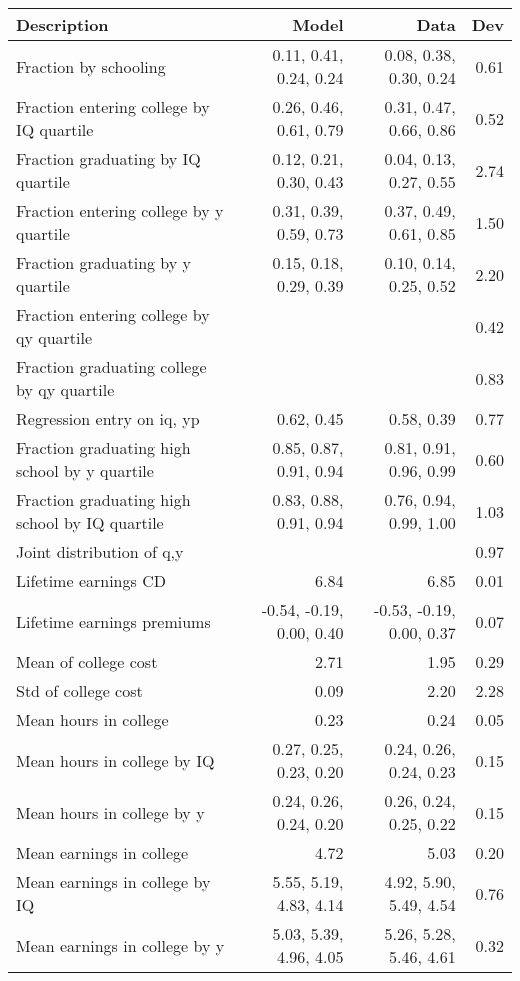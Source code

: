 \begin{tabular}{lrrr}
\hline
Description & Model  & Data  & Dev  \\ 
\hline
Fraction by schooling & 0.11, 0.41, 0.24, 0.24  & 0.08, 0.38, 0.30, 0.24  & 0.61  \\ 
Fraction entering college by IQ quartile & 0.26, 0.46, 0.61, 0.79  & 0.31, 0.47, 0.66, 0.86  & 0.52  \\ 
Fraction graduating by IQ quartile & 0.12, 0.21, 0.30, 0.43  & 0.04, 0.13, 0.27, 0.55  & 2.74  \\ 
Fraction entering college by y quartile & 0.31, 0.39, 0.59, 0.73  & 0.37, 0.49, 0.61, 0.85  & 1.50  \\ 
Fraction graduating by y quartile & 0.15, 0.18, 0.29, 0.39  & 0.10, 0.14, 0.25, 0.52  & 2.20  \\ 
Fraction entering college by qy quartile &   &   & 0.42  \\ 
Fraction graduating college by qy quartile &   &   & 0.83  \\ 
Regression entry on iq, yp & 0.62, 0.45  & 0.58, 0.39  & 0.77  \\ 
Fraction graduating high school by y quartile & 0.85, 0.87, 0.91, 0.94  & 0.81, 0.91, 0.96, 0.99  & 0.60  \\ 
Fraction graduating high school by IQ quartile & 0.83, 0.88, 0.91, 0.94  & 0.76, 0.94, 0.99, 1.00  & 1.03  \\ 
Joint distribution of q,y &   &   & 0.97  \\ 
Lifetime earnings CD & 6.84  & 6.85  & 0.01  \\ 
Lifetime earnings premiums & -0.54, -0.19, 0.00, 0.40  & -0.53, -0.19, 0.00, 0.37  & 0.07  \\ 
Mean of college cost & 2.71  & 1.95  & 0.29  \\ 
Std of college cost & 0.09  & 2.20  & 2.28  \\ 
Mean hours in college & 0.23  & 0.24  & 0.05  \\ 
Mean hours in college by IQ & 0.27, 0.25, 0.23, 0.20  & 0.24, 0.26, 0.24, 0.23  & 0.15  \\ 
Mean hours in college by y & 0.24, 0.26, 0.24, 0.20  & 0.26, 0.24, 0.25, 0.22  & 0.15  \\ 
Mean earnings in college & 4.72  & 5.03  & 0.20  \\ 
Mean earnings in college by IQ & 5.55, 5.19, 4.83, 4.14  & 4.92, 5.90, 5.49, 4.54  & 0.76  \\ 
Mean earnings in college by y & 5.03, 5.39, 4.96, 4.05  & 5.26, 5.28, 5.46, 4.61  & 0.32  \\ 

\end{tabular}
